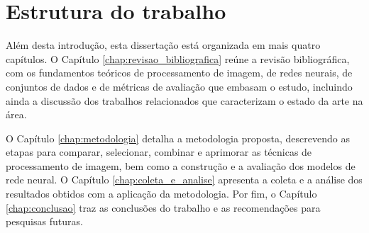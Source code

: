 \section{Estrutura do trabalho}

Além desta introdução, esta dissertação está organizada em mais quatro capítulos. O Capítulo \ref{chap:revisao_bibliografica} reúne a revisão bibliográfica, com os fundamentos teóricos de processamento de imagem, de redes neurais, de conjuntos de dados e de métricas de avaliação que embasam o estudo, incluindo ainda a discussão dos trabalhos relacionados que caracterizam o estado da arte na área.

O Capítulo \ref{chap:metodologia} detalha a metodologia proposta, descrevendo as etapas para comparar, selecionar, combinar e aprimorar as técnicas de processamento de imagem, bem como a construção e a avaliação dos modelos de rede neural. O Capítulo \ref{chap:coleta_e_analise} apresenta a coleta e a análise dos resultados obtidos com a aplicação da metodologia. Por fim, o Capítulo \ref{chap:conclusao} traz as conclusões do trabalho e as recomendações para pesquisas futuras.
